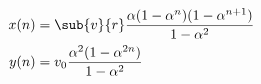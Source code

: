 \begin{align*}
	x(n) &= \sub{v}{r} \frac{\alpha (1- \alpha^n)(1- \alpha^{n+1})}{1-\alpha^2} \\
	y(n) &= v_0 \frac{\alpha^2 (1- \alpha^{2n})}{1-\alpha^2}
\end{align*}